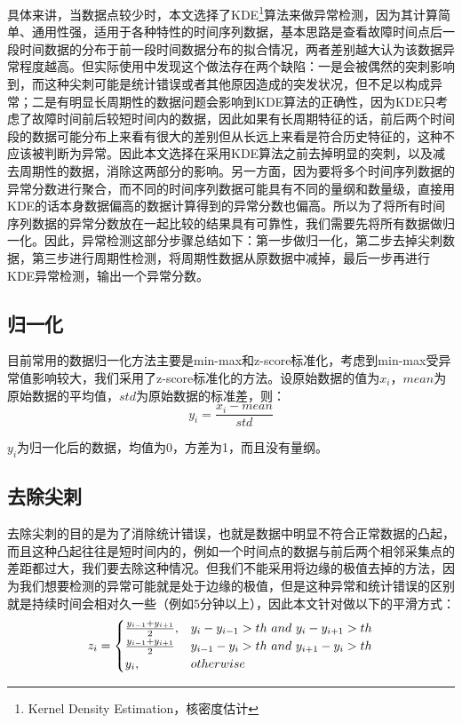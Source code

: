 具体来讲，当数据点较少时，本文选择了KDE\footnote{Kernel Density Estimation，核密度估计}算法来做异常检测，因为其计算简单、通用性强，适用于各种特性的时间序列数据，基本思路是查看故障时间点后一段时间数据的分布于前一段时间数据分布的拟合情况，两者差别越大认为该数据异常程度越高。但实际使用中发现这个做法存在两个缺陷：一是会被偶然的突刺影响到，而这种尖刺可能是统计错误或者其他原因造成的突发状况，但不足以构成异常；二是有明显长周期性的数据问题会影响到KDE算法的正确性，因为KDE只考虑了故障时间前后较短时间内的数据，因此如果有长周期特征的话，前后两个时间段的数据可能分布上来看有很大的差别但从长远上来看是符合历史特征的，这种不应该被判断为异常。因此本文选择在采用KDE算法之前去掉明显的突刺，以及减去周期性的数据，消除这两部分的影响。另一方面，因为要将多个时间序列数据的异常分数进行聚合，而不同的时间序列数据可能具有不同的量纲和数量级，直接用KDE的话本身数据偏高的数据计算得到的异常分数也偏高。所以为了将所有时间序列数据的异常分数放在一起比较的结果具有可靠性，我们需要先将所有数据做归一化。因此，异常检测这部分步骤总结如下：第一步做归一化，第二步去掉尖刺数据，第三步进行周期性检测，将周期性数据从原数据中减掉，最后一步再进行KDE异常检测，输出一个异常分数。
\subsection{归一化}
目前常用的数据归一化方法主要是min-max和z-score标准化，考虑到min-max受异常值影响较大，我们采用了z-score标准化的方法。设原始数据的值为$x_i$，$mean$为原始数据的平均值，$std$为原始数据的标准差，则：
\begin{equation*}
y_i = \frac{x_i-mean}{std}
\end{equation*}

$y_i$为归一化后的数据，均值为0，方差为1，而且没有量纲。
\subsection{去除尖刺}
去除尖刺的目的是为了消除统计错误，也就是数据中明显不符合正常数据的凸起，而且这种凸起往往是短时间内的，例如一个时间点的数据与前后两个相邻采集点的差距都过大，我们要去除这种情况。但我们不能采用将边缘的极值去掉的方法，因为我们想要检测的异常可能就是处于边缘的极值，但是这种异常和统计错误的区别就是持续时间会相对久一些（例如5分钟以上），因此本文针对做以下的平滑方式：
\begin{equation*}
z_i = \begin{cases} \frac{y_{i-1} + y_{i+1}}{2}, & y_i - y_{i-1} > th\ and\ y_i - y_{i+1} > th \cr \frac{y_{i-1} + y_{i+1}}{2} & y_{i-1} - y_i > th\ and\ y_{i+1} - y_i > th \cr y_i, & otherwise  \end{cases}
\end{equation*}

